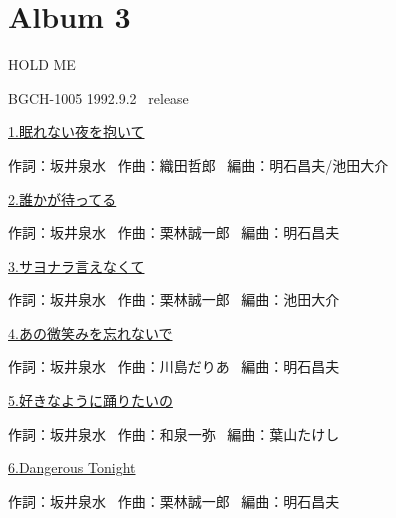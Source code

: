 \chapter{Album 3}
\thispagestyle{empty} %
\vspace{-16mm}
\LARGE {HOLD ME}

\normalsize{BGCH-1005 1992.9.2 \ release}
\\

\vspace{-5mm}


\small{\hyperlink{3_0}{1.眠れない夜を抱いて}}

\tiny{作詞：坂井泉水 \ 作曲：織田哲郎 \ 編曲：明石昌夫/池田大介}

\small{\hyperlink{3_1}{2.誰かが待ってる}}

\tiny{作詞：坂井泉水 \ 作曲：栗林誠一郎 \ 編曲：明石昌夫}

\small{\hyperlink{3_2}{3.サヨナラ言えなくて}}

\tiny{作詞：坂井泉水 \ 作曲：栗林誠一郎 \ 編曲：池田大介}

\small{\hyperlink{3_3}{4.あの微笑みを忘れないで}}

\tiny{作詞：坂井泉水 \ 作曲：川島だりあ \ 編曲：明石昌夫}

\small{\hyperlink{3_4}{5.好きなように踊りたいの}}

\tiny{作詞：坂井泉水 \ 作曲：和泉一弥 \ 編曲：葉山たけし}

\small{\hyperlink{3_5}{6.Dangerous Tonight}}

\tiny{作詞：坂井泉水 \ 作曲：栗林誠一郎 \ 編曲：明石昌夫}

